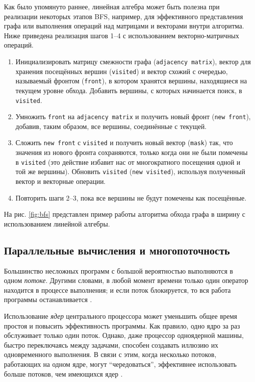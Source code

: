 Как было упомянуто раннее, линейная алгебра может быть полезна при реализации некоторых этапов BFS, например, для эффективного представления графа или выполнения операций над матрицами и векторами внутри алгоритма. Ниже приведена реализация шагов 1--4 с использованием векторно-матричных операций.

\begin{enumerate}
    \item Инициализировать матрицу смежности графа (\texttt{ad\-ja\-cen\-cy mat\-rix}), вектор для хранения посещённых вершин (\texttt{visited}) и вектор схожий с очередью, называемый фронтом (\texttt{front}), в котором хранятся вершины, находящиеся на текущем уровне обхода. Добавить вершины, с которых начинается поиск, в \texttt{visited}.
    \item Умножить \texttt{front} на \texttt{adjacency matrix} и получить новый фронт  (\texttt{new front}), добавив, таким образом, все вершины, соединённые с текущей. 
    \item Сложить \texttt{new front} с \texttt{visited} и получить новый вектор (\texttt{mask}) так, что значения из нового фронта сохраняются, только когда они не были помечены в \texttt{visited} (это действие избавит нас от многократного посещения одной и той же вершины). Обновить \texttt{visited} (\texttt{new visited}), используя полученный вектор и векторные операции.
    \item Повторить шаги 2--3, пока все вершины не будут помечены как посещённые.
\end{enumerate}

На рис. \ref{fig:bfs} представлен пример работы алгоритма обхода графа в ширину с использованием линейной алгебры.

\subsection{Параллельные вычисления и многопоточность}

Большинство несложных программ с большой вероятностью выполняются в одном \textit{потоке}. Другими словами, в любой момент времени только один оператор находится в процессе выполнения; и если поток блокируется, то вся работа программы останавливается \cite{sarcar2022threading}.

Использование \textit{ядер} центрального процессора может уменьшить общее время простоя и повысить эффективность программы. Как правило, одно ядро за раз обслуживает только один поток. Однако, даже процессор одноядерной машины, быстро переключаясь между задачами, способен создавать иллюзию их одновременного выполнения. В связи с этим, когда несколько потоков, работающих на одном ядре, могут \enquote{чередоваться}, эффективнее использовать больше потоков, чем имеющихся ядер \cite{Lee2020}.

